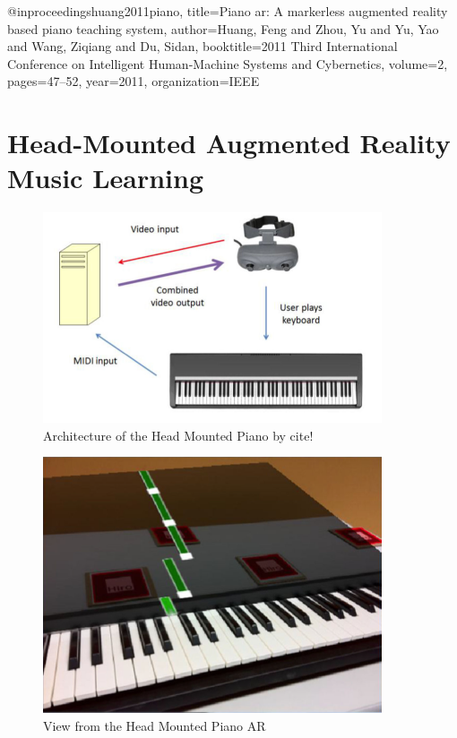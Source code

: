 \documentclass{article}
\begin{document}
@inproceedings{huang2011piano,
  title={Piano ar: A markerless augmented reality based piano teaching system},
  author={Huang, Feng and Zhou, Yu and Yu, Yao and Wang, Ziqiang and Du, Sidan},
  booktitle={2011 Third International Conference on Intelligent Human-Machine Systems and Cybernetics},
  volume={2},
  pages={47--52},
  year={2011},
  organization={IEEE}
}


\section{Head-Mounted Augmented Reality Music Learning}

\begin{figure}
    \centering
    \includegraphics[width=10cm]{figures/headmountedpiano1.png}
    \caption{Architecture of the Head Mounted Piano by cite! }
    \label{fig:pianoheadmountedarch}
\end{figure}

\begin{figure}
    \centering
    \includegraphics[width=10cm]{figures/headmountedview.png}
    \caption{View from the Head Mounted Piano AR  }
    \label{fig:View from the HeadMounted}
\end{figure}
\end{document}
